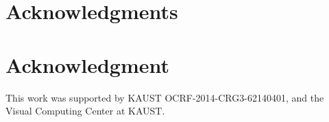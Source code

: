 \documentclass[10pt,journal,compsoc]{IEEEtran}
\begin{document}
\ifCLASSOPTIONcompsoc
  \section*{Acknowledgments}
\else
  \section*{Acknowledgment}
\fi


This work was supported by KAUST OCRF-2014-CRG3-62140401, and the
Visual Computing Center at KAUST.


\ifCLASSOPTIONcaptionsoff
  \newpage
\fi






%
%
%




% 
\end{document}
